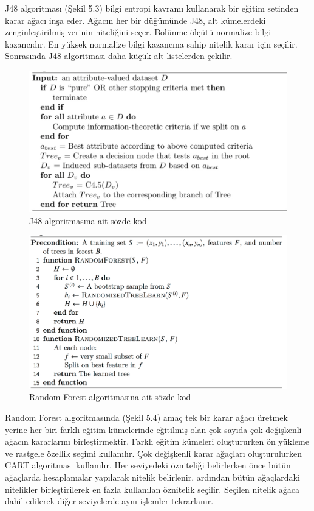 J48 algoritması (Şekil 5.3) bilgi entropi kavramı kullanarak bir eğitim setinden karar ağacı inşa eder. Ağacın her bir düğümünde J48, alt kümelerdeki zenginleştirilmiş verinin niteliğini seçer. Bölünme ölçütü normalize bilgi kazancıdır. En yüksek normalize bilgi kazancına sahip nitelik karar için seçilir. Sonrasında J48 algoritması daha küçük alt listelerden çekilir.


\begin{figure}[!htbp]
\centering
\includegraphics[width=\textwidth]{projectChapters/images/j48pscode.png}
\caption{J48 algoritmasına ait sözde kod}
\end{figure}

\begin{figure}[!htbp]
\centering
\includegraphics[width=\textwidth]{projectChapters/images/randomForest.png}
\caption{Random Forest algoritmasına ait sözde kod}
\end{figure}

Random Forest algoritmasında (Şekil 5.4) amaç tek bir karar ağacı üretmek yerine her biri farklı eğitim kümelerinde eğitilmiş olan çok sayıda çok değişkenli ağacın kararlarını birleştirmektir. Farklı eğitim kümeleri oluştururken ön yükleme ve rastgele özellik seçimi kullanılır. Çok değişkenli karar ağaçları oluşturulurken CART algoritması kullanılır. Her seviyedeki özniteliği belirlerken önce bütün ağaçlarda hesaplamalar yapılarak nitelik belirlenir, ardından bütün ağaçlardaki nitelikler birleştirilerek en fazla kullanılan öznitelik seçilir. Seçilen nitelik ağaca dahil edilerek diğer seviyelerde aynı işlemler tekrarlanır.


